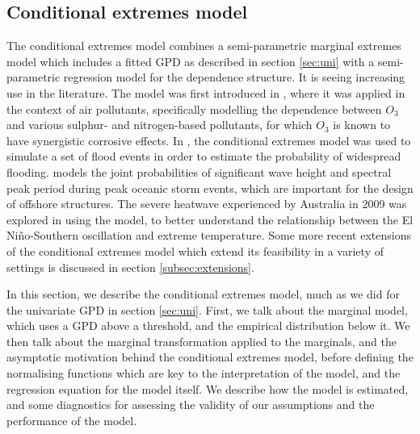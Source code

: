 \documentclass{article}
\numberwithin{equation}{section}
\begin{document}

\subsection{Conditional extremes model}


The conditional extremes model combines a semi-parametric marginal extremes model which includes a fitted GPD as described in section \ref{sec:uni} with a semi-parametric regression model for the dependence structure. 
It is seeing increasing use in the literature.
The model was first introduced in \citet{Heffernan2004}, where it was applied in the context of air pollutants, specifically modelling the dependence between $O_3$ and various sulphur- and nitrogen-based pollutants, for which $O_3$ is known to have synergistic corrosive effects. 
In \citet{Keef2012_flooding}, the conditional extremes model was used to simulate a set of flood events in order to estimate the probability of widespread flooding. 
\citet{Jonathan2013} models the joint probabilities of significant wave height and spectral peak period during peak oceanic storm events, which are important for the design of offshore structures. 
The severe heatwave experienced by Australia in 2009 was explored in \citet{Winter2016} using the model, to better understand the relationship between the El Niño-Southern oscillation and extreme temperature.
Some more recent extensions of the conditional extremes model which extend its feasibility in a variety of settings is discussed in section \ref{subsec:extensions}.

In this section, we describe the conditional extremes model, much as we did for the univariate GPD in section \ref{sec:uni}.
First, we talk about the marginal model, which uses a GPD above a threshold, and the empirical distribution below it. 
We then talk about the marginal transformation applied to the marginals, and the asymptotic motivation behind the conditional extremes model, before defining the normalising functions which are key to the interpretation of the model, and the regression equation for the model itself.
We describe how the model is estimated, and some diagnostics for assessing the validity of our assumptions and the performance of the model.
\end{document}
